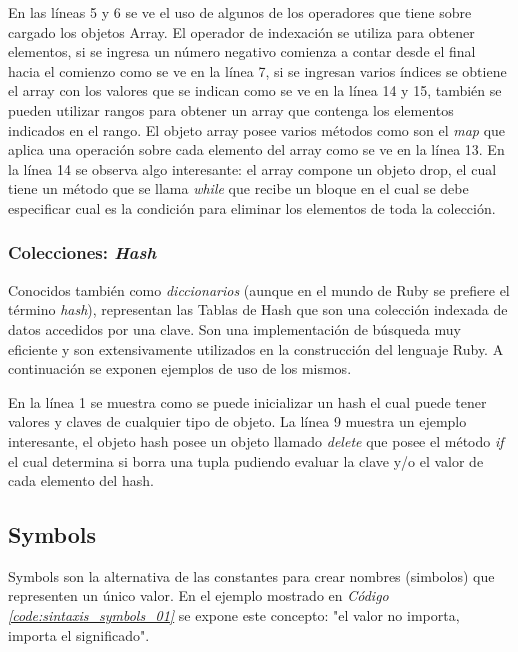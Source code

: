 \documentclass{article}
\newcommand{\refcode}[1]{\textit{Código \ref{#1}}}
\begin{document}
En las líneas 5 y 6 se ve el uso de algunos de los operadores que tiene sobre cargado los objetos Array.  El operador de indexación se utiliza para obtener elementos, si se ingresa un número negativo comienza a contar desde el final hacia el comienzo como se ve en la línea 7, si se ingresan varios índices se obtiene el array con los valores que se indican como se ve en la línea 14 y 15, también se pueden utilizar rangos para obtener un array que contenga los elementos indicados en el rango. El objeto array posee varios métodos como son el \textit{map} que aplica una operación sobre cada elemento del array como se ve en la línea 13. En la línea 14 se observa algo interesante: el array compone un objeto drop, el cual tiene un método que se llama \textit{while} que recibe un bloque en el cual se debe especificar cual es la condición para eliminar los elementos de toda la colección.
\bigskip



\subsubsection{Colecciones: \textit{Hash}}
Conocidos también como \textit{diccionarios} (aunque en el mundo de Ruby se prefiere el término \textit{hash}), representan las Tablas de Hash que son una colección indexada de datos accedidos por una clave. Son una implementación de búsqueda muy eficiente y son extensivamente utilizados en la construcción del lenguaje Ruby. A continuación se exponen ejemplos de uso de los mismos.

 
\bigskip

En la línea 1 se muestra como se puede inicializar un hash el cual puede tener valores y claves de cualquier tipo de objeto. La línea 9 muestra un ejemplo interesante, el  objeto hash posee un objeto llamado \textit{delete} que posee el método \textit{if} el cual determina si borra una tupla pudiendo evaluar la clave y/o el valor de cada elemento del hash.
\bigskip



\subsection{Symbols}
Symbols son la alternativa de las constantes para crear nombres (simbolos) que representen un único valor.  En el ejemplo mostrado en  \refcode{code:sintaxis_symbols_01}  se expone este concepto: "el valor no importa, importa el significado".
\bigskip
\end{document}
